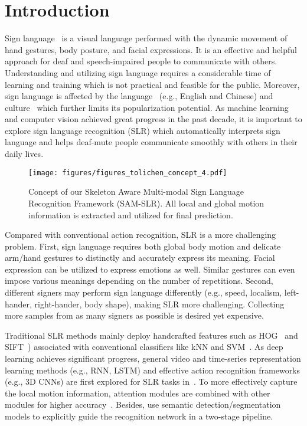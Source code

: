 \documentclass[final]{cvpr}
\begin{document}
\section{Introduction}
Sign language~\cite{SL_intro} is a visual language performed with the dynamic movement of hand gestures, body posture, and facial expressions. It is an effective and helpful approach for deaf and speech-impaired people to communicate with others. Understanding and utilizing sign language requires a considerable time of learning and training which is not practical and feasible for the public. Moreover, sign language is affected by the language~\cite{SL_book1,SL_book2,yang2010chinese} (e.g., English and Chinese) and culture~\cite{different_culture} which further limits its popularization potential. As machine learning and computer vision achieved great progress in the past decade, it is important to explore sign language recognition (SLR) which automatically interprets sign language and helps deaf-mute people communicate smoothly with others in their daily lives.

\begin{figure}[t]
\centering
\texttt{[image: figures/figures\_tolichen\_concept\_4.pdf]}
   \caption{Concept of our Skeleton Aware Multi-modal Sign Language Recognition Framework (SAM-SLR). All local and global motion information is extracted and utilized for final prediction.}
\label{fig:pipline}
\end{figure}



Compared with conventional action recognition, SLR is a more challenging problem. 
First, sign language requires both global body motion and delicate arm/hand gestures to distinctly and accurately express its meaning. Facial expression can be utilized to express emotions as well. 
Similar gestures can even impose various meanings depending on the number of repetitions. 
Second, different signers may perform sign language differently (e.g., speed, localism, left-hander, right-hander, body shape), making SLR more challenging. Collecting more samples from as many signers as possible is desired yet expensive.

Traditional SLR methods mainly deploy handcrafted features such as HOG~\cite{hog_feature} and SIFT~\cite{sift_feature}) associated with conventional classifiers like kNN and SVM~\cite{yang2010chinese,dardas2011real,memics2013kinect}. As deep learning achieves significant progress, general video and time-series representation learning methods (e.g., RNN, LSTM) and effective action recognition frameworks (e.g., 3D CNNs) are first explored for SLR tasks in~\cite{sincan2019isolated,li2020word,pigou2018beyond,tur2019isolated}. To more effectively capture the local motion information, attention modules are combined with other modules for higher accuracy~\cite{huang2018video,huang2018attention}. 
Besides, \cite{lim2019isolated,li2018deep,shi2018american} use semantic detection/segmentation models to explicitly guide the recognition network in a two-stage pipeline. 
\end{document}

